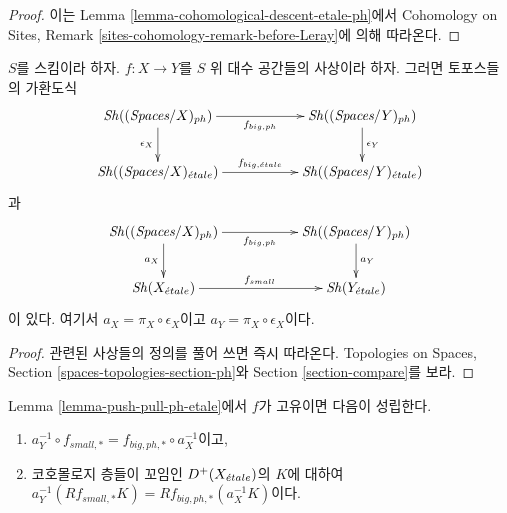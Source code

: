 \begin{proof}
이는 Lemma \ref{lemma-cohomological-descent-etale-ph}에서
Cohomology on Sites, Remark
\ref{sites-cohomology-remark-before-Leray}에 의해 따라온다.
\end{proof}

\begin{lemma}
\label{lemma-push-pull-ph-etale}
$S$를 스킴이라 하자.
$f : X \to Y$를 $S$ 위 대수 공간들의 사상이라 하자.
그러면 토포스들의 가환도식
$$
\xymatrix{
\Sh((\textit{Spaces}/X)_{ph}) \ar[rr]_{f_{big, ph}} \ar[d]_{\epsilon_X} & &
\Sh((\textit{Spaces}/Y)_{ph}) \ar[d]^{\epsilon_Y} \\
\Sh((\textit{Spaces}/X)_\etale) \ar[rr]^{f_{big, \etale}} & &
\Sh((\textit{Spaces}/Y)_\etale)
}
$$
과
$$
\xymatrix{
\Sh((\textit{Spaces}/X)_{ph}) \ar[rr]_{f_{big, ph}} \ar[d]_{a_X} & &
\Sh((\textit{Spaces}/Y)_{ph}) \ar[d]^{a_Y} \\
\Sh(X_\etale) \ar[rr]^{f_{small}} & &
\Sh(Y_\etale)
}
$$
이 있다. 여기서 $a_X = \pi_X \circ \epsilon_X$이고
$a_Y = \pi_X \circ \epsilon_X$이다.
\end{lemma}

\begin{proof}
관련된 사상들의 정의를 풀어 쓰면 즉시 따라온다.
Topologies on Spaces, Section
\ref{spaces-topologies-section-ph}와 Section \ref{section-compare}를 보라.
\end{proof}

\begin{lemma}
\label{lemma-proper-push-pull-ph-etale}
Lemma \ref{lemma-push-pull-ph-etale}에서 $f$가 고유이면 다음이 성립한다.
\begin{enumerate}
\item $a_Y^{-1} \circ f_{small, *} = f_{big, ph, *} \circ a_X^{-1}$이고,
\item 코호몰로지 층들이 꼬임인 $D^+(X_{\acute{e}tale})$의 $K$에 대하여\\
$a_Y^{-1}(Rf_{small, *}K) = Rf_{big, ph, *}(a_X^{-1}K)$이다.
\end{enumerate}
\end{lemma}

